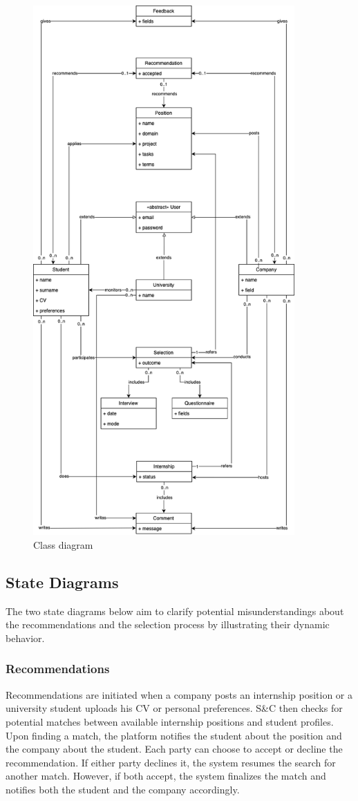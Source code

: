 \begin{figure}
    \centering
    \includegraphics[width=10cm]{images/class-diagram.png}
    \caption{Class diagram}
\end{figure}

\subsection{State Diagrams}
The two state diagrams below aim to clarify potential misunderstandings about the recommendations and the selection process by illustrating their dynamic behavior.

\subsubsection{Recommendations}
Recommendations are initiated when a company posts an internship position or a university student uploads his CV or personal preferences.
S\&C then checks for potential matches between available internship positions and student profiles.
Upon finding a match, the platform notifies the student about the position and the company about the student.
Each party can choose to accept or decline the recommendation.
If either party declines it, the system resumes the search for another match.
However, if both accept, the system finalizes the match and notifies both the student and the company accordingly.

